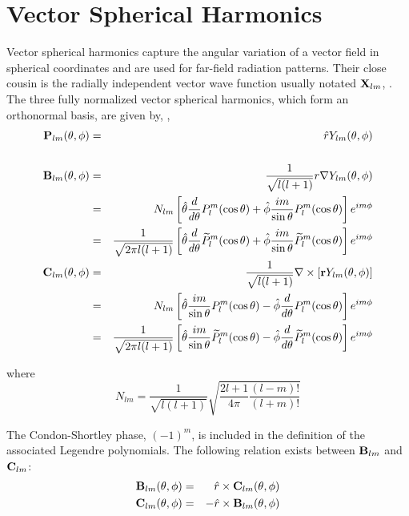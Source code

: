 {\footnotesize
{}
}

\clearpage

\section{Vector Spherical Harmonics}
\label{sec:vecsphharm}
Vector spherical harmonics capture the angular variation of a vector field in spherical coordinates and are used for far-field radiation patterns. Their close cousin is the radially independent vector wave function usually notated $\mathbf{X}_{lm}$, \cite{jackson1999classical}. The three fully normalized vector spherical harmonics, which form an orthonormal basis, are given by, \cite{chew1995waves, tsang2000scattering}, 
\begin{eqnarray}
\mathbf{P}_{lm}(\theta,\phi) &=& \hat{r}Y_{lm}(\theta,\phi) \\
\  & \ & \nonumber \\
\mathbf{B}_{lm}(\theta,\phi) &=&\dfrac{1}{\sqrt{ l(l+1)}} r\nabla Y_{lm}(\theta,\phi)  \\
\ &=& N_{lm} \left[\hat\theta \dfrac{d}{d\theta} P_l^m(\cos\theta) + \hat\phi \dfrac{im}{\sin\theta}P_l^m(\cos\theta) \right] e^{im\phi}   \\
\ &=& \dfrac{1}{\sqrt{2\pi l(l+1)}} \left[\hat\theta \dfrac{d}{d\theta} \widetilde{P}_l^m(\cos\theta) + \hat\phi \dfrac{im}{\sin\theta}\widetilde{P}_l^m(\cos\theta) \right] e^{im\phi}  \\
\mathbf{C}_{lm}(\theta,\phi) &=& \dfrac{1}{\sqrt{ l(l+1)}} \nabla \times \left[ \mathbf{r} Y_{lm}(\theta,\phi) \right] \\
\ &=& N_{lm} \left[\hat\theta \dfrac{im}{\sin\theta}P_l^m(\cos\theta) - \hat\phi \dfrac{d}{d\theta} P_l^m(\cos\theta)  \right] e^{im\phi}  \\
\ &=& \dfrac{1}{\sqrt{2\pi l(l+1)}}  \left[\hat\theta \dfrac{im}{\sin\theta}\widetilde{P}_l^m(\cos\theta) - \hat\phi \dfrac{d}{d\theta} \widetilde{P}_l^m(\cos\theta)  \right] e^{im\phi} 
\end{eqnarray}

\noindent where
\begin{equation}
N_{lm} = \dfrac{1}{\sqrt{l(l+1)}}\sqrt{\dfrac{2l+1}{4\pi}\dfrac{(l-m)!}{(l+m)!}}
\end{equation}

The Condon-Shortley phase, $(-1)^m$, is included in the definition of the associated Legendre polynomials. The following relation exists between $\mathbf{B}_{lm}$ and $\mathbf{C}_{lm}$:
\begin{eqnarray}
\mathbf{B}_{lm}(\theta,\phi) &=& \hat{r} \times \mathbf{C}_{lm}(\theta,\phi) \\
\mathbf{C}_{lm}(\theta,\phi) &=& -\hat{r} \times \mathbf{B}_{lm}(\theta,\phi) 
\end{eqnarray}

